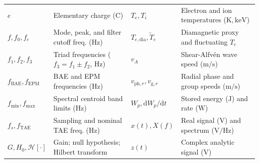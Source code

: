 \documentclass[12pt]{article}
\begin{document}
{\begin{tabularx}{\textwidth}{@{}l >{\raggedright\arraybackslash}X l >{\raggedright\arraybackslash}X@{}}
$e$ & Elementary charge ($\mathrm{C}$) & $T_e, T_i$ & Electron and ion temperatures ($\mathrm{K}, \mathrm{keV}$) \\
$f, f_0, f_c$ & Mode, peak, and filter cutoff freq. ($\mathrm{Hz}$) & $T_{e,\mathrm{dia}}, \tilde{T}_e$ & Diamagnetic proxy and fluctuating $T_e$ \\
$f_1, f_2, f_3$ & Triad frequencies ($f_3 = f_1 \pm f_2$, $\mathrm{Hz}$) & $v_A$ & Shear-Alfv\'en wave speed ($\mathrm{m/s}$) \\
$f_{\mathrm{BAE}}, f_{\mathrm{EPM}}$ & BAE and EPM frequencies ($\mathrm{Hz}$) & $v_{\mathrm{ph},r}, v_{\mathrm{g},r}$ & Radial phase and group speeds ($\mathrm{m/s}$) \\
$f_{\min}, f_{\max}$ & Spectral centroid band limits ($\mathrm{Hz}$) & $W_p, \mathrm{d}W_p/\mathrm{d}t$ & Stored energy ($\mathrm{J}$) and rate ($\mathrm{W}$) \\
$f_s, f_{\mathrm{TAE}}$ & Sampling and nominal TAE freq. ($\mathrm{Hz}$) & $x(t), X(f)$ & Real signal ($\mathrm{V}$) and spectrum ($\mathrm{V/Hz}$) \\
$G, H_0, \mathcal{H}[\cdot]$ & Gain; null hypothesis; Hilbert transform & $z(t)$ & Complex analytic signal ($\mathrm{V}$) \\
\bottomrule
\end{tabularx}}
\end{document}

